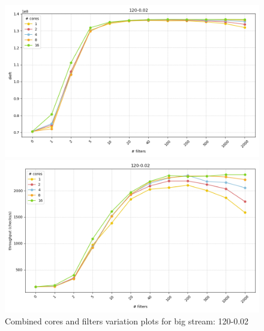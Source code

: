 \documentclass[12pt,a4paper]{article}
\begin{document}
\begin{figure}[H]
    \vspace{0.5cm} %

    \hspace*{-3cm} %
    \begin{minipage}{0.5\textwidth}
        \centering
        \includegraphics[scale=0.4]{images/4-Experiments/NRT/small/120-0.02/combined/plots/dieft-1.png}
        \caption*{}
    \end{minipage}
    \hspace{0.16\textwidth}
    \begin{minipage}{0.5\textwidth}
        \centering
        \includegraphics[scale=0.4]{images/4-Experiments/NRT/small/120-0.02/combined/plots/throughput-1.png}
        \caption*{}
    \end{minipage}

    \caption{Combined cores and filters variation plots for big stream: 120-0.02}
    \label{img:exps-small-120-combined}
\end{figure}
\end{document}
